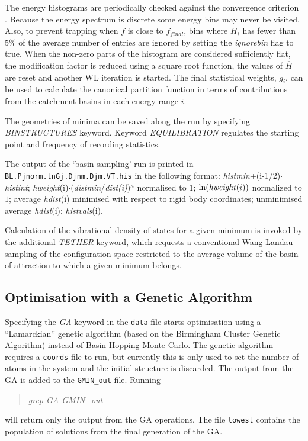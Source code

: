 \documentclass[12pt,a4paper,dvips]{article}
\begin{document}
The energy histograms are periodically checked against the convergence criterion . 
Because the energy spectrum is discrete some energy bins may never be visited.  
Also, to prevent trapping when $f$ is close to
$f_{final}$,  bins where $H_i$ has fewer than $5 \%$ of the average number of entries are 
ignored by setting the {\it ignorebin} flag
to true. When the non-zero parts of the
histogram are considered sufficiently flat,
the modification factor is reduced using
a square root function, the values of $\overline{H}$ are reset and another WL iteration is started. 
The final statistical weights, $g_i$, can be used to calculate the canonical partition function in 
terms of contributions from the catchment basins in each energy range $i$.  

The geometries of minima can be saved along the run by specifying {\it BINSTRUCTURES } keyword. Keyword {\it EQUILIBRATION}
regulates the starting point and frequency of recording statistics.

The output of the `basin-sampling' run is printed in {\tt BL.Pjnorm.lnGj.Djnm.Djm.VT.his} in the
following format: 
{\it histmin}+(i-1/2)$\cdot${\it histint}; {\it hweight}(i)$\cdot$({\it distmin}/{\it dist(i)})$^\kappa$ 
normalised to $1$; ${\it \ln(hweight}(i))$ normalized to $1$;
average {\it hdist}(i) minimised with respect to rigid body coordinates; unminimised average 
{\it hdist}(i); {\it histvals}(i). 

Calculation of the
vibrational density of states for a given minimum is invoked by 
the additional {\it TETHER} keyword, which
requests a conventional Wang-Landau sampling of the configuration 
space restricted to the average volume of the basin of
attraction to which a given minimum belongs.\cite{BogdanWC06}

\subsection{Optimisation with a Genetic Algorithm}
\label{sec:GA}
Specifying the {\it GA} keyword in the {\tt data} file starts optimisation using
a ``Lamarckian'' genetic algorithm\cite{OakleyWJ11Energy} (based on the
Birmingham Cluster Genetic Algorithm\cite{Johnston03}) instead of Basin-Hopping Monte Carlo. The genetic
algorithm requires a {\tt coords} file to run, but currently this is only used
to set the number of atoms in the system and the initial structure is discarded.
The output from the GA is added to the {\tt GMIN\_out} file. Running
\begin{quote}
{\it grep GA GMIN\_out}
\end{quote}
will return only the output from the GA operations. The file {\tt lowest}
contains the population of solutions from the final generation of the GA.
\end{document}
